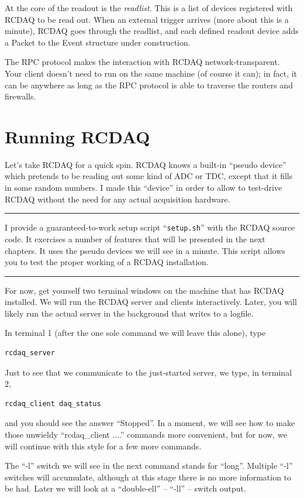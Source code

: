 \documentclass{article}[11pt]
\newcommand{\pointout}[1]{
\vskip 3mm
\begin{minipage}[c]{\linewidth}
\hrule
\vskip 2mm
\begin{minipage}[c]{0.1\linewidth}
{\Huge\color{red}\ding{43}}
\end{minipage}
\begin{minipage}[c]{0.9\linewidth}
#1
\end{minipage}
\vskip 2mm
\hrule
\end{minipage}
\vskip 3mm
}
\begin{document}
At the core of the readout is the \emph{readlist}. This is a list of
devices registered with RCDAQ to be read out. When an external trigger
arrives (more about this is a minute), RCDAQ goes through the
readlist, and each defined readout device adds a Packet to the Event
structure under construction.

The RPC protocol makes the interaction with RCDAQ
network-transparent. Your client doesn't need to run on the same
machine (of course it can); in fact, it can be anywhere as long as
the RPC protocol is able to traverse the routers and firewalls. 


\section{Running RCDAQ}
\label{running}

Let's take RCDAQ for a quick spin. RCDAQ knows a built-in ``pseudo
device'' which pretends to be reading out some kind of ADC or TDC,
except that it fills in some random numbers. I made this ``device'' in
order to allow to test-drive RCDAQ without the need for any actual
acquisition hardware.

\pointout{I provide a guaranteed-to-work setup script ``{\tt setup.sh}'' with
the RCDAQ source code. It exercises a number of features that will be
presented in the next chapters. It uses the pseudo devices we will see
in a minute. This script allows you to test the proper working of a
RCDAQ installation.}


For now, get yourself two terminal windows on the machine that has
RCDAQ installed. We will run the RCDAQ server and clients
interactively. Later, you will likely run the actual server in the
background that writes to a logfile.

In terminal 1 (after the one sole command we will leave this alone), type
\begin{verbatim}
rcdaq_server 
\end{verbatim}

Just to see that we communicate to the just-started server, we type,
in terminal 2,
\begin{verbatim}
rcdaq_client daq_status 
\end{verbatim}

and you should see the answer ``Stopped''. In a moment, we will see
how to make those unwieldy ``rcdaq\_client ....'' commands more
convenient, but for now, we will continue with this style for a few
more commands.

The ``-l'' switch we will see in the next command stands for
``long''. Multiple ``-l'' switches will accumulate, although 
at this stage there is no more information to be had. Later we will look
at a ``double-ell'' -- ``-ll'' -- switch output.  
\end{document}
